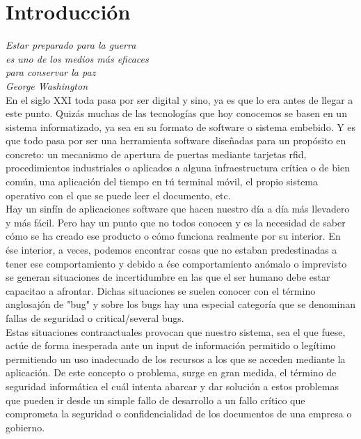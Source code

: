 \chapter{Introducción}
\label{chap:introducción}

\emph{Estar preparado para la guerra\\ es uno de los medios más eficaces\\ para conservar la paz\\ George Washington}\\

En el siglo XXI toda pasa por ser digital y sino, ya es que lo era antes de llegar a este punto. Quizás muchas de las tecnologías que hoy conocemos se basen en un sistema informatizado, ya sea en su formato de software o sistema embebido. Y es que todo pasa por ser una herramienta software diseñadas para un propósito en concreto: un mecanismo de apertura de puertas mediante tarjetas rfid, procedimientos industriales o aplicados a alguna infraestructura crítica o de bien común, una aplicación del tiempo en tú terminal móvil, el propio sistema operativo con el que se puede leer el documento, etc. \\

Hay un sinfín de aplicaciones software que hacen nuestro día a día más llevadero y más fácil. Pero hay un punto que no todos conocen y es la necesidad de saber cómo se ha creado ese producto o cómo funciona realmente por su interior. En ése interior, a veces, podemos encontrar cosas que no estaban predestinadas a tener ese comportamiento y debido a ése comportamiento anómalo o imprevisto se generan situaciones de incertidumbre en las que el ser humano debe estar capacitao a afrontar. Dichas situaciones se suelen conocer con el término anglosajón de "bug" y sobre los bugs hay una especial categoría que se denominan fallas de seguridad o critical/several bugs. \\

Estas situaciones contraactuales provocan que nuestro sistema, sea el que fuese, actúe de forma inesperada ante un input de información permitido o legítimo permitiendo un uso inadecuado de los recursos a los que se acceden mediante la aplicación. De este concepto o problema, surge en gran medida, el término de seguridad informática el cuál intenta abarcar y dar solución a estos problemas que pueden ir desde un simple fallo de desarrollo a un fallo crítico que comprometa la seguridad o confidencialidad de los documentos de una empresa o gobierno. \\

